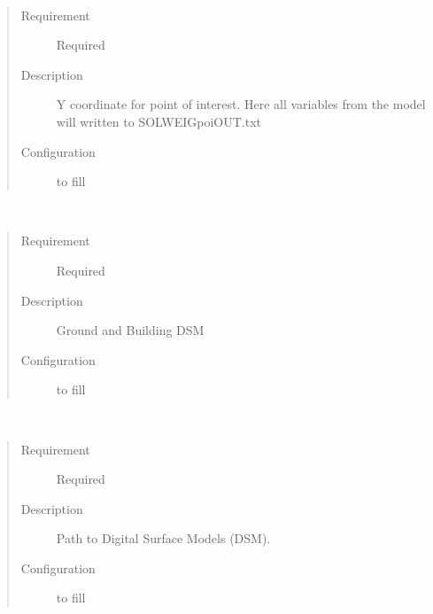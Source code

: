 \documentclass[letterpaper,10pt,english]{sphinxmanual}
\begin{document}

\begin{fulllineitems}
\label{\detokenize{input_files/SOLWEIG_input/SOLWEIGinput:cmdoption-arg-col}}~\begin{quote}\begin{description}
\item[{Requirement}] \leavevmode
Required

\item[{Description}] \leavevmode
Y coordinate for point of interest. Here all variables from the model will written to SOLWEIGpoiOUT.txt

\item[{Configuration}] \leavevmode
to fill

\end{description}\end{quote}

\end{fulllineitems}


\begin{fulllineitems}
\label{\detokenize{input_files/SOLWEIG_input/SOLWEIGinput:cmdoption-arg-dsmname}}~\begin{quote}\begin{description}
\item[{Requirement}] \leavevmode
Required

\item[{Description}] \leavevmode
Ground and Building DSM

\item[{Configuration}] \leavevmode
to fill

\end{description}\end{quote}

\end{fulllineitems}


\begin{fulllineitems}
\label{\detokenize{input_files/SOLWEIG_input/SOLWEIGinput:cmdoption-arg-dsmpath}}~\begin{quote}\begin{description}
\item[{Requirement}] \leavevmode
Required

\item[{Description}] \leavevmode
Path to Digital Surface Models (DSM).

\item[{Configuration}] \leavevmode
to fill

\end{description}\end{quote}

\end{fulllineitems}
\end{document}
